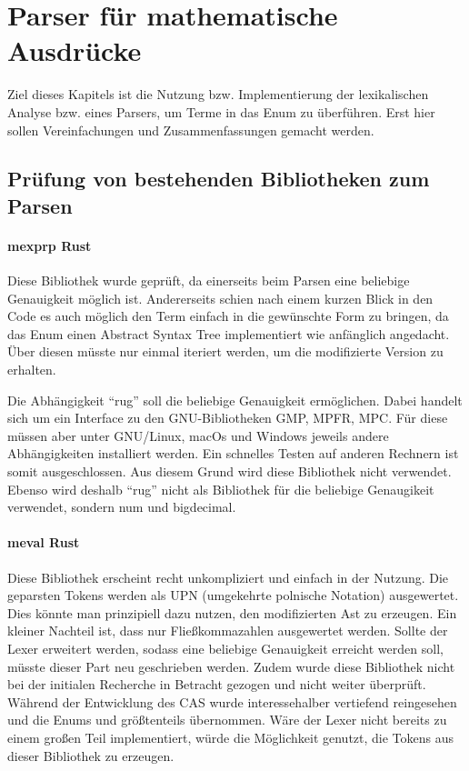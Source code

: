 \documentclass[11pt,a4paper, ngerman]{article}
\begin{document}
\newpage

\section{Parser für mathematische Ausdrücke}
Ziel dieses Kapitels ist die Nutzung bzw. Implementierung der lexikalischen Analyse bzw. eines Parsers, um Terme in das Enum  zu überführen. Erst hier sollen Vereinfachungen und Zusammenfassungen gemacht werden. 
\subsection{Prüfung von bestehenden Bibliotheken zum Parsen}
\paragraph{mexprp Rust} \cite{CrateMexprp} Diese Bibliothek wurde geprüft, da einerseits beim Parsen eine beliebige Genauigkeit möglich ist. Andererseits schien nach einem kurzen Blick in den Code es auch möglich den Term einfach in die gewünschte Form zu bringen, da das Enum  einen Abstract Syntax Tree implementiert wie anfänglich angedacht. Über diesen müsste nur einmal iteriert werden, um die modifizierte Version zu erhalten.

Die Abhängigkeit ``rug'' soll die beliebige Genauigkeit ermöglichen. Dabei handelt sich um ein Interface zu den GNU-Bibliotheken GMP, MPFR, MPC. Für diese müssen aber unter GNU/Linux, macOs und Windows jeweils andere Abhängigkeiten installiert werden. Ein schnelles Testen auf anderen Rechnern ist somit ausgeschlossen. Aus diesem Grund wird diese Bibliothek nicht verwendet. Ebenso wird deshalb ``rug'' nicht als Bibliothek für die beliebige Genaugikeit verwendet, sondern num und bigdecimal.

\paragraph{meval Rust} \cite{CrateMeval} Diese Bibliothek erscheint recht unkompliziert und einfach in der Nutzung. Die geparsten Tokens werden als UPN (umgekehrte polnische Notation) ausgewertet. Dies könnte man prinzipiell dazu nutzen, den modifizierten Ast zu erzeugen. Ein kleiner Nachteil ist, dass nur Fließkommazahlen ausgewertet werden. Sollte der Lexer erweitert werden, sodass eine beliebige Genauigkeit erreicht werden soll, müsste dieser Part neu geschrieben werden. Zudem wurde diese Bibliothek nicht bei der initialen Recherche in Betracht gezogen und nicht weiter überprüft. Während der Entwicklung des CAS wurde interessehalber vertiefend reingesehen und die Enums  und  größtenteils übernommen. Wäre der Lexer nicht bereits zu einem großen Teil implementiert, würde die Möglichkeit genutzt, die Tokens aus dieser Bibliothek zu erzeugen.
\end{document}
